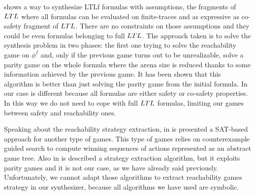 \cite{GAMS2020} shows a way to synthesize LTLf formulas with assumptions, the fragments of $LTL$ where all formulas can be evaluated on finite-traces and as expressive as co-safety fragment of $LTL$. 
There are no constraints on those assumptions and they could be even formulas belonging to full $LTL$. 
The approach taken is to solve the synthesis problem in two phases: the first one trying to solve the reachability game on $\phi^f$ and, only if the previous game turns out to be unrealizable, solve a parity game on the whole formula where the arena size is reduced thanks to some information achieved by the previous game.
It has been shown that this algorithm is better than just solving the parity game from the initial formula.
In our case is different because all formulas are either safety or co-safety properties. 
In this way we do not need to cope with full $LTL$ formulas, limiting our games between safety and reachability ones.

Speaking about the reachability strategy extraction, in \cite{ELNR2015} is presented a SAT-based approach for another type of games. This type of games relies on counterexample guided search to compute winning sequences of actions represented as an abstract game tree.
Also in \cite{GAMS2020} is described a strategy extraction algorithm, but it exploits parity games and it is not our case, as we have already said previously.
Unfortunately, we cannot adapt those algorithms to extract reachability games strategy in our synthesizer, because all algorithms we have used are symbolic.
